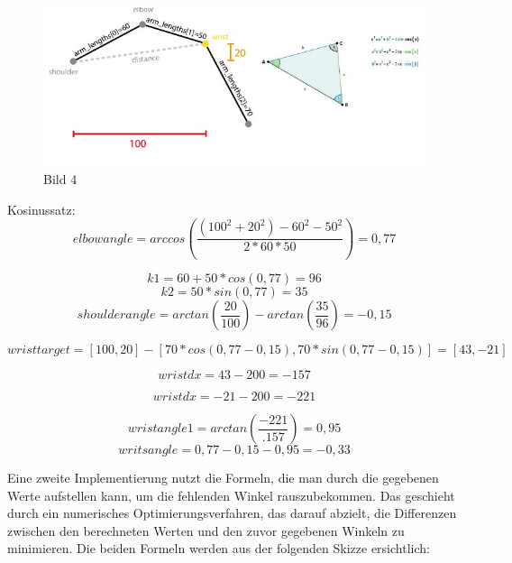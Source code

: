 \documentclass[12pt]{article}
\begin{document}
                    \begin{figure}[h]
                        \centering
                        \includegraphics[width = \linewidth]{Bild 4}
                        \caption{Bild 4}
                    \end{figure}

                    Kosinussatz:
                    \[
                        elbowangle = arccos(\frac{(100^2 +20^2)-60^2-50^2}{2*60*50}) = 0,77
                    \]

                    \[
                        k1 = 60 +50 * cos(0,77) = 96
                    \]
                    \[
                        k2 = 50*sin(0,77) = 35
                    \]
                    \[
                        shoulderangle = arctan(\frac{20}{100}) - arctan(\frac{35}{96}) = -0,15
                    \]


                    \[
                        wristtarget = [100, 20] - [70 * cos(0,77 - 0,15), 70* sin(0,77 -0,15)] = [43, -21]
                    \]

                    \[
                        wristdx = 43 - 200 = -157
                    \]

                    \[
                        wristdx = -21 - 200 = -221
                    \]

                    \[
                        wristangle1 = arctan(\frac{-221}{.157})= 0,95
                    \]
                    \[
                        writsangle = 0,77 -0,15 -0,95 = -0,33
                    \]

                    Eine zweite Implementierung nutzt die Formeln, die man durch die gegebenen Werte aufstellen kann, um die fehlenden
                    Winkel rauszubekommen. Das geschieht durch ein numerisches Optimierungsverfahren, das darauf abzielt, die Differenzen
                    zwischen den berechneten Werten und den zuvor gegebenen Winkeln zu minimieren.
                    Die beiden Formeln werden aus der folgenden Skizze ersichtlich:
\end{document}

